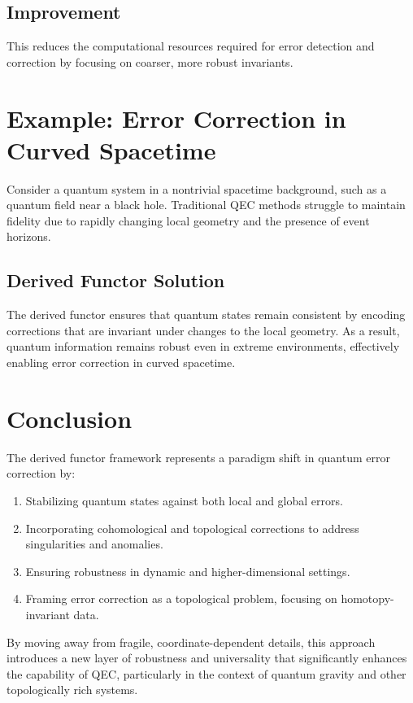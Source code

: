 \documentclass[11pt]{article}
\begin{document}
\subsection{Improvement}
This reduces the computational resources required for error detection and correction by focusing on coarser, more robust invariants.

\section{Example: Error Correction in Curved Spacetime}
Consider a quantum system in a nontrivial spacetime background, such as a quantum field near a black hole. Traditional QEC methods struggle to maintain fidelity due to rapidly changing local geometry and the presence of event horizons.

\subsection{Derived Functor Solution}
The derived functor ensures that quantum states remain consistent by encoding corrections that are invariant under changes to the local geometry. As a result, quantum information remains robust even in extreme environments, effectively enabling error correction in curved spacetime.

\section{Conclusion}
The derived functor framework represents a paradigm shift in quantum error correction by:
\begin{enumerate}
    \item Stabilizing quantum states against both local and global errors.
    \item Incorporating cohomological and topological corrections to address singularities and anomalies.
    \item Ensuring robustness in dynamic and higher-dimensional settings.
    \item Framing error correction as a topological problem, focusing on homotopy-invariant data.
\end{enumerate}

By moving away from fragile, coordinate-dependent details, this approach introduces a new layer of robustness and universality that significantly enhances the capability of QEC, particularly in the context of quantum gravity and other topologically rich systems.
\end{document}
